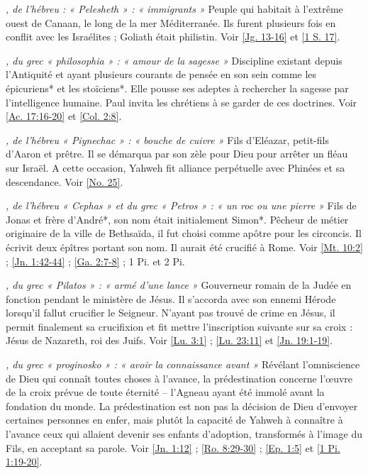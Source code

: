 \begin{multicols}{2}
\textit{, de l'hébreu : « Pelesheth » : « immigrants »}\newline
Peuple qui habitait à l'extrême ouest de Canaan, le long de la mer Méditerranée. Ils furent plusieurs fois en conflit avec les Israélites ; Goliath était philistin. Voir \vref{Jg. 13-16} et \vref{1 S. 17}.

\textit{, du grec « philosophia » : « amour de la sagesse »}\newline
Discipline existant depuis l'Antiquité et ayant plusieurs courants de pensée en son sein comme les épicuriens* et les stoïciens*. Elle pousse ses adeptes à rechercher la sagesse par l'intelligence humaine. Paul invita les chrétiens à se garder de ces doctrines. Voir \vref{Ac. 17:16-20} et \vref{Col. 2:8}.

\textit{, de l'hébreu « Piynechac » : « bouche de cuivre »}\newline
Fils d'Eléazar, petit-fils d'Aaron et prêtre. Il se démarqua par son zèle pour Dieu pour arrêter un fléau sur Israël. A cette occasion, Yahweh fit alliance perpétuelle avec Phinées et sa descendance. Voir \vref{No. 25}.

\textit{, de l'hébreu « Cephas » et du grec « Petros » : « un roc ou une pierre »}\newline
Fils de Jonas et frère d'André*, son nom était initialement Simon*. Pêcheur de métier originaire de la ville de Bethsaïda, il fut choisi comme apôtre pour les circoncis. Il écrivit deux épîtres portant son nom. Il aurait été crucifié à Rome. Voir \vref{Mt. 10:2} ; \vref{Jn. 1:42-44} ; \vref{Ga. 2:7-8} ; 1 Pi. et 2 Pi.

\textit{, du grec « Pilatos » : « armé d'une lance »}\newline
Gouverneur romain de la Judée en fonction pendant le ministère de Jésus. Il s'accorda avec son ennemi Hérode lorsqu'il fallut crucifier le Seigneur. N'ayant pas trouvé de crime en Jésus, il permit finalement sa crucifixion et fit mettre l'inscription suivante sur sa croix : Jésus de Nazareth, roi des Juifs. Voir \vref{Lu. 3:1} ; \vref{Lu. 23:11} et \vref{Jn. 19:1-19}.

\textit{, du grec « proginosko » : « avoir la connaissance avant »}\newline
Révélant l'omniscience de Dieu qui connaît toutes choses à l'avance, la prédestination concerne l'œuvre de la croix prévue de toute éternité – l'Agneau ayant été immolé avant la fondation du monde. La prédestination est non pas la décision de Dieu d'envoyer certaines personnes en enfer, mais plutôt la capacité de Yahweh à connaître à l'avance ceux qui allaient devenir ses enfants d'adoption, transformés à l'image du Fils, en acceptant sa parole. Voir \vref{Jn. 1:12} ; \vref{Ro. 8:29-30} ; \vref{Ep. 1:5} et \vref{1 Pi. 1:19-20}.


\end{multicols}

